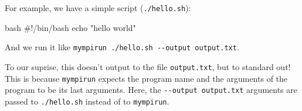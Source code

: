 For example, we have a simple script (\lstinline|./hello.sh|):

\begin{code}{bash}
#!/bin/bash
echo "hello world"
\end{code}

And we run it like \lstinline|mympirun ./hello.sh --output output.txt|.

To our suprise, this doesn't output to the file \lstinline|output.txt|, but to standard out!
This is because \lstinline|mympirun| expects the program name and the arguments of the program to
be its last arguments. Here, the \lstinline|--output output.txt| arguments are passed to
\lstinline|./hello.sh| instead of to \lstinline|mympirun|.
